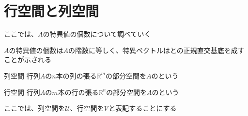 \documentclass[../../../topic_linear-algebra]{subfiles}
\begin{document}
\sectionline
\section{行空間と列空間}

ここでは、$A$の特異値の個数について調べていく

$A$の特異値の個数は$A$の階数に等しく、特異ベクトルはとの正規直交基底を成すことが示される

\begin{definition}{列空間}
  行列$A$の$n$本の列の張る$\mathbb{R}^m$の部分空間を$A$のという
\end{definition}

\begin{definition}{行空間}
  行列$A$の$m$本の行の張る$\mathbb{R}^n$の部分空間を$A$のという
\end{definition}

ここでは、列空間を$\mathcal{U}$、行空間を$\mathcal{V}$と表記することにする
\end{document}
